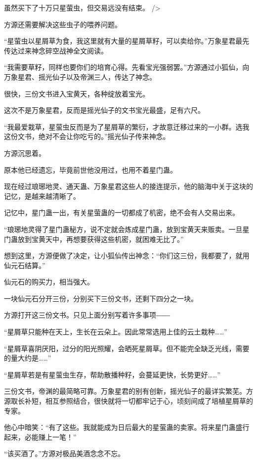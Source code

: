 
\begin{this_body}

虽然买下了十万只星萤虫，但交易远没有结束。 />

方源还需要解决这些虫子的喂养问题。

“星萤虫以星屑草为食，我这里就有大量的星屑草籽，可以卖给你。”万象星君最先传达过来神念碎空战神全文阅读。

“我需要草籽，同样也要你们的培育心得。先看宝光强弱罢。”方源通过小狐仙，向万象星君、摇光仙子以及帝渊三人，传达了神念。

很快，三份文书进入宝黄天，各种绽放着宝光。

这次不是万象星君，反而是摇光仙子的文书宝光最盛，足有六尺。

“我最爱栽草，星萤虫反而是为了星屑草的繁衍，才故意迁移过来的一小群。选我这份文书，绝对不会让你吃亏的。”摇光仙子传来神念。

方源沉思着。

原本他已经遗忘，毕竟前世他没用过，也用不着星门蛊。

现在经过琅琊地灵、通天蛊、万象星君这些人的接连提示，他的脑海中关于这块的记忆，是越来越清晰了。

记忆中，星门蛊一出，有关星萤蛊的一切都成了机密，绝不会有人交易出来。

“琅琊地灵得了星门蛊秘方，说不定就会炼成星门蛊，放到宝黄天来贩卖。一旦星门蛊放到宝黄天中，再想要获得这些机密，就困难无比了。”

想到这里，方源便做了决定，让小狐仙传出神念：“你们这三份，我都要了，就用仙元石结算。”

仙元石的购买力，相当强大。

一块仙元石分开三份，分别买下三份文书，还剩下四分之一块。

方源打开这三份文书。只见上面分别写着许多事项――

“星屑草只能种在天上，生长在云朵上。因此常常选用上佳的云土栽种……”

“星屑草喜阴厌阳，过分的阳光照耀，会晒死星屑草。但不能完全缺乏光线，需要的量大约是……”

“星屑草若是有星萤虫生存，帮助散播种籽，会蔓延更快，长势更好……”

三份文书，帝渊的最简略可靠。万象星君的别有创新，摇光仙子的最详实繁芜。方源取长补短，相互参照结合，很快就将一切都牢记于心，顷刻间成了培植星屑草的专家。

他心中暗笑：“有了这些。我就能成为日后最大的星萤蛊的卖家。将来星门蛊盛行起来，必能赚上一笔！”

“该买酒了。”方源对极品美酒念念不忘。


\end{this_body}
